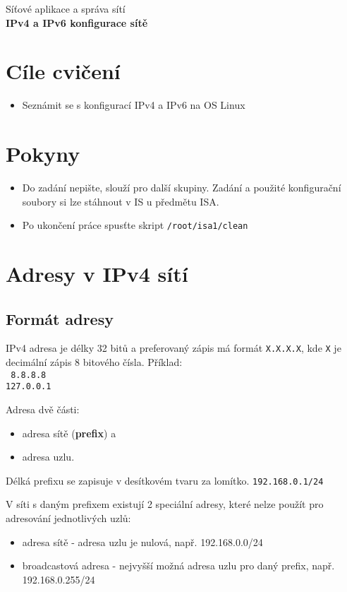 \documentclass[a4paper,11pt,draft]{article}
\begin{document}
\begin{center}
    {\LARGE Síťové aplikace a správa sítí}\\[2em]

    {\huge\bf IPv4 a IPv6 konfigurace sítě}\\[2em]
\end{center}

\section*{Cíle cvičení}
\begin{itemize}
    \item Seznámit se s konfigurací IPv4 a IPv6 na OS Linux
\end{itemize}

\section*{Pokyny}
\begin{itemize}
    \item Do zadání nepište, slouží pro další skupiny. Zadání a použité
        konfigurační soubory si lze stáhnout v IS u předmětu ISA.
    \item Po ukončení práce spusťte skript {\tt /root/isa1/clean}
\end{itemize}

\section{Adresy v IPv4 sítí}

\subsection{Formát adresy}
IPv4 adresa je délky 32 bitů a preferovaný zápis má formát {\tt X.X.X.X}, kde
{\tt X} je decimální zápis 8 bitového čísla. Příklad:\\
{\tt
8.8.8.8 \\
127.0.0.1 \\
}

Adresa dvě části:
\begin{itemize}
    \item adresa sítě ({\bf prefix}) a
    \item adresa uzlu.
\end{itemize}
Délká prefixu se zapisuje v desítkovém tvaru za lomítko. {\tt 192.168.0.1/24}

V síti s daným prefixem existují 2 speciální adresy, které nelze použít pro
adresování jednotlivých uzlů:
\begin{itemize}
    \item adresa sítě - adresa uzlu je nulová, např. 192.168.0.0/24
    \item broadcastová adresa - nejvyšší možná adresa uzlu pro daný prefix,
        např. 192.168.0.255/24
\end{itemize}
\end{document}
